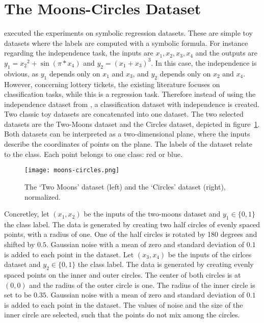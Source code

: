 \section{The Moons-Circles Dataset}\label{sec:independece_dataset}
\textcite{BIMT} executed the experiments on symbolic regression datasets.
These are simple toy datasets where the labels are computed with a symbolic formula. 
For instance regarding the independence task, the inputs are $x_1, x_2, x_3, x_4$ and the outputs are $y_1={x_2}^2 + \sin{(\pi*x_4)}$ and $y_2={(x_1+x_3)}^3$.
In this case, the independence is obvious, as $y_1$ depends only on $x_1$ and $x_3$, and $y_2$ depends only on $x_2$ and $x_4$.
However, concerning lottery tickets, the existing literature focuses on classification tasks, while this is a regression task.
Therefore instead of using the independence dataset from \autocite{BIMT}, a classification dataset with independence is created.
Two classic toy datasets are concatenated into one dataset.
The two selected datasets are the Two-Moons dataset and the Circles dataset, depicted in figure~\ref{fig:moons_circles}.
Both datasets can be interpreted as a two-dimensional plane, where the inputs describe the coordinates of points on the plane. 
The labels of the dataset relate to the class.
Each point belongs to one class: red or blue.

\begin{figure}[ht]
    \centering
    \texttt{[image: moons-circles.png]}
    \caption{
        The `Two Moons' dataset (left) and the `Circles' dataset (right), normalized. 
    }\label{fig:moons_circles}
\end{figure}

Concretley, let $( x_1 , x_2 )$ be the inputs of the two-moons dataset and $y_1 \in \{0,1\}$ the class label.
The data is generated by creating two half circles of evenly spaced points, with a radius of one.
One of the half circles is rotated by 180 degrees and shifted by $0.5$.
Gaussian noise with a mean of zero and standard deviation of $0.1$ is added to each point in the dataset.
Let $( x_3 , x_4 )$ be the inputs of the cirlces dataset and $y_2 \in \{0,1\}$ the class label.
The data is generated by creating evenly spaced points on the inner and outer circles. 
The center of both circles is at $(0,0)$ and the radius of the outer circle is one.
The radius of the inner circle is set to be $0.35$.
Gaussian noise with a mean of zero and standard deviation of $0.1$ is added to each point in the dataset.
The values of noise and the size of the inner circle are selected, such that the points do not mix among the circles.

